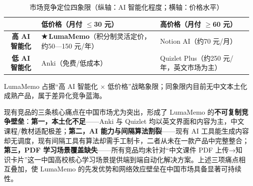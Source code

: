 \begin{table}[htbp]
  \centering
  \caption{市场竞争定位四象限（纵轴：AI 智能化程度；横轴：价格水平）}
  \label{tab:positioning_map}
  \renewcommand{\arraystretch}{2.8}
  \begin{tabular}{c||p{5.0cm}|p{5.0cm}}
    & \textbf{低价格（月付 $\leq$30 元）} & \textbf{高价格（月付 $\geq$60 元）} \\
    \hline\hline
    \textbf{高 AI 智能化}
      & \textbf{★\,LumaMemo}\newline（积分制灵活定价，约50—150 元/年）
      & Notion AI\newline（约70 元/月）\\
    \hline
    \textbf{低 AI 智能化}
      & Anki\newline（免费/低成本）
      & Quizlet Plus\newline（约250 元/年，英文市场为主）\\
  \end{tabular}
  \begin{flushleft}
    \footnotesize LumaMemo 占据“高 AI 智能化 × 低价格”战略象限；同象限内目前无中文本土化成熟产品，属于差异化竞争蓝海。
  \end{flushleft}
\end{table}

现有竞品的三条核心痛点在中国市场尤为突出，形成了 LumaMemo 的\textbf{不可复制竞争壁垒}：\textbf{第一，本土化不足}——Anki 与 Quizlet 均以英文界面和内容为主，中文课程/教材适配极差；\textbf{第二，AI 能力与间隔算法割裂}——现有 AI 工具能生成内容却无调度，现有间隔工具有算法却需手工制卡，二者从未在一款产品中完整整合；\textbf{第三，PDF 学习场景覆盖缺失}——所有竞品均未针对“中文课件 PDF 上传→知识卡片”这一中国高校核心学习场景提供端到端自动化解决方案。上述三项痛点相互叠加，使 LumaMemo 的先发优势和网络效应壁垒在中国市场具备显著可持续性。　

